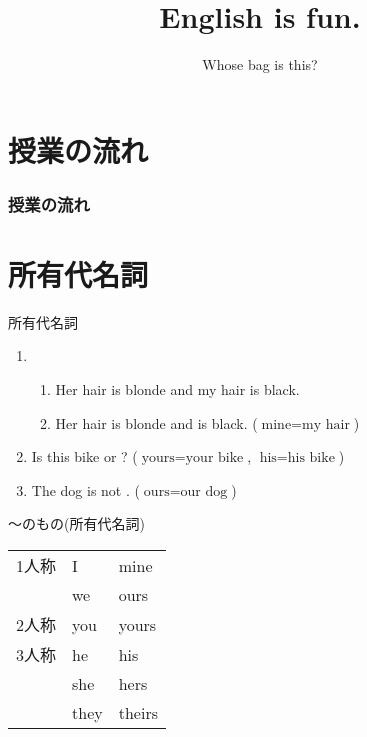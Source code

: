 \documentclass[aspectratio=169,xcolor={dvipsnames,table}]{beamer}
\title{English is fun.}
\subtitle{Whose bag is this?}
\author{}
\institute[]{}
\date[]
\begin{document}
\begin{frame}[plain]
  \titlepage
\end{frame}

\section*{授業の流れ}
\begin{frame}[plain]
  \frametitle{授業の流れ}
  \tableofcontents
\end{frame}
\section{所有代名詞}
\begin{frame}[plain]{所有代名詞}
 
\begin{enumerate}
 \item \begin{enumerate}
	\item Her hair is blonde and my hair is black.
	\item Her hair is blonde and  is black. ($\text{mine} = \text{my hair}$)
       \end{enumerate}
 \item Is this bike  or ? ($\text{yours} = \text{your bike}$, $\text{his} = \text{his bike}$)
 \item The dog is not . ($\text{ours} = \text{our dog}$)
\end{enumerate}


\hfill{\scriptsize {}}

\end{frame}
\begin{frame}[plain]{〜のもの(所有代名詞)}
 
 \begin{center}
\begin{tabular}{lll}\toprule
1人称&I&mine\\
&we&ours\\
2人称&you&yours\\
3人称&he&his\\
&she&hers\\
&they&theirs\\
\bottomrule
\end{tabular}
\end{center}
\end{frame}
\end{document}
